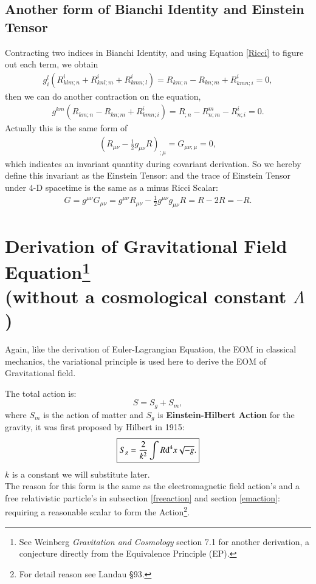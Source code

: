 \documentclass[openany,10pt]{book}
\theoremstyle{definition}
\theoremstyle{definition}
\theoremstyle{remark}
\newcommand{\be}{\begin{eqnarray}}
\newcommand{\ee}{\end{eqnarray}}
\begin{document}
\subsection{Another form of Bianchi Identity and Einstein Tensor}
Contracting two indices in Bianchi Identity, and using Equation \ref{Ricci} to figure out each term, we obtain
\be
g^l_i\left( R^i_{klm;n}+R^i_{knl;m}+R^i_{kmn;l}\right)=R_{km;n}-R_{kn;m}+R^i_{kmn;i}=0,
\ee
then we can do another contraction on the equation,
\be
g^{km}\left(R_{km;n}-R_{kn;m}+R^i_{kmn;i}\right)=R_{;n}-R^m_{n;m}-R^i_{n;i}=0.
\ee
Actually this is the same form of 
\be
\left(R_{\mu\nu}-\frac{1}{2}g_{\mu\nu}R\right)_{;\mu}=G_{\mu\nu;\mu}=0,
\ee
which indicates an invariant quantity during covariant derivation. So we hereby define this invariant as the Einstein Tensor:
and the trace of Einstein Tensor under 4-D spacetime is the same as a minus Ricci Scalar:
\be
G=g^{\mu\nu}G_{\mu\nu}=g^{\mu\nu}R_{\mu\nu}-\frac{1}{2}g^{\mu\nu}g_{\mu\nu}R=R-2R=-R.
\ee

\section[Gravitational Field Equation]{  Derivation of Gravitational Field Equation\footnote{See Weinberg \textit{Gravitation and Cosmology} section 7.1 for another derivation, a conjecture directly from the Equivalence Principle (EP).} \\ (without a cosmological constant $\Lambda$)}
Again, like the derivation of Euler-Lagrangian Equation, the EOM in classical mechanics, the variational principle is used here to derive the EOM of Gravitational field.

The total action is:
\begin{equation}
    S=S_g+S_m,
\end{equation}
where $S_m$ is the action of matter and $S_g$ is \textbf{Einstein-Hilbert Action} for the gravity, it was first proposed by Hilbert in 1915:
\begin{equation}
    \boxed{S_g=\frac{2}{k^2}\int R {\rm d}^4x\sqrt{-g}.}
\end{equation}
$k$ is a constant we will substitute later.\\
The reason for this form is the same as the electromagnetic field action's and a free relativistic particle's in subsection \ref{freeaction} and section \ref{emaction}: requiring a reasonable scalar to form the Action\footnote{For detail reason see Landau \S 93.}. 
\end{document}
